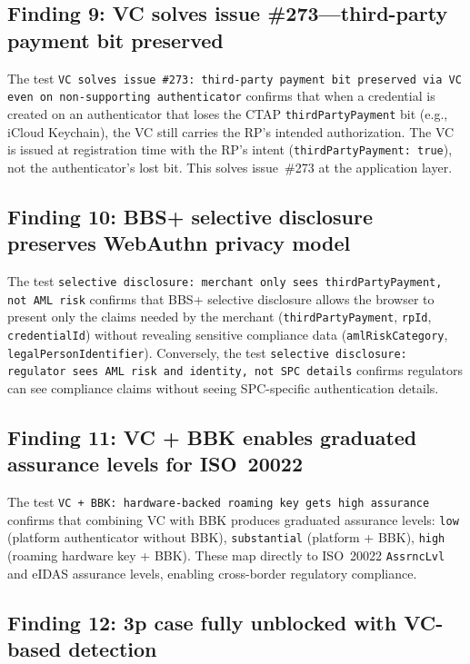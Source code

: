 \documentclass[12pt,a4paper]{article}
\begin{document}
\subsection{Finding 9: VC solves issue \#273---third-party payment bit preserved}

The test \texttt{VC solves issue \#273: third-party payment bit preserved via VC even on non-supporting authenticator} confirms that when a credential is created on an authenticator that loses the CTAP \texttt{thirdPartyPayment} bit (e.g., iCloud Keychain), the VC still carries the RP's intended authorization. The VC is issued at registration time with the RP's intent (\texttt{thirdPartyPayment: true}), not the authenticator's lost bit. This solves issue~\#273 at the application layer.

\subsection{Finding 10: BBS+ selective disclosure preserves WebAuthn privacy model}

The test \texttt{selective disclosure: merchant only sees thirdPartyPayment, not AML risk} confirms that BBS+ selective disclosure allows the browser to present only the claims needed by the merchant (\texttt{thirdPartyPayment}, \texttt{rpId}, \texttt{credentialId}) without revealing sensitive compliance data (\texttt{amlRiskCategory}, \texttt{legalPersonIdentifier}). Conversely, the test \texttt{selective disclosure: regulator sees AML risk and identity, not SPC details} confirms regulators can see compliance claims without seeing SPC-specific authentication details.

\subsection{Finding 11: VC + BBK enables graduated assurance levels for ISO~20022}

The test \texttt{VC + BBK: hardware-backed roaming key gets high assurance} confirms that combining VC with BBK produces graduated assurance levels: \texttt{low} (platform authenticator without BBK), \texttt{substantial} (platform + BBK), \texttt{high} (roaming hardware key + BBK). These map directly to ISO~20022 \texttt{AssrncLvl} and eIDAS assurance levels, enabling cross-border regulatory compliance.

\subsection{Finding 12: 3p case fully unblocked with VC-based detection}
\end{document}
